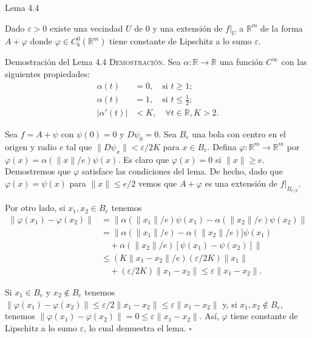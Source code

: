 \documentclass[10pt]{beamer}
\begin{document}
	\begin{frame}{Lema 4.4}
		\begin{lemma}[4.4]
			Dado $\varepsilon > 0$ existe una vecindad $U$ de $0$ y una extensión de $f|_U$ a $\mathbb{R}^m$ de la forma $A + \varphi$ donde $\varphi \in C^0_b(\mathbb{R}^m)$ tiene constante de Lipschitz a lo sumo $\varepsilon$.
		\end{lemma}
	\end{frame}
	
	\begin{frame}[allowframebreaks]{Demostración del Lema 4.4}
		\textsc{Demostración.} Sea $\alpha: \mathbb{R} \to \mathbb{R}$ una función $C^\infty$ con las siguientes propiedades:
		\begin{align*}
			\alpha(t) &= 0, \quad \text{si } t \ge 1; \\
			\alpha(t) &= 1, \quad \text{si } t \le \frac{1}{2}; \\
			|\alpha'(t)| &< K, \quad \forall t \in \mathbb{R}, K > 2.
		\end{align*}
		
		Sea $f = A + \psi$ con $\psi(0) = 0$ y $D\psi_0 = 0$. Sea $B_e$ una bola con centro en el origen y radio $e$ tal que $\|D\psi_x\| < \varepsilon/2K$ para $x \in B_e$. Defina $\varphi: \mathbb{R}^m \to \mathbb{R}^m$ por $\varphi(x) = \alpha(\|x\|/e)\psi(x)$. Es claro que $\varphi(x) = 0$ si $\|x\| \ge e$. Demostremos que $\varphi$ satisface las condiciones del lema. De hecho, dado que $\varphi(x) = \psi(x)$ para $\|x\| \le e/2$ vemos que $A + \varphi$ es una extensión de $f|_{B_{e/2}}$. 
		
		\framebreak
		
		Por otro lado, si $x_1, x_2 \in B_e$ tenemos
		\begin{align*}
			\|\varphi(x_1) - \varphi(x_2)\| &= \|\alpha(\|x_1\|/e)\psi(x_1) - \alpha(\|x_2\|/e)\psi(x_2)\| \\
			&= \|\alpha(\|x_1\|/e) - \alpha(\|x_2\|/e)]\psi(x_1) \\
			&\quad + \alpha(\|x_2\|/e)[\psi(x_1) - \psi(x_2)]\| \\
			&\le (K\|x_1 - x_2\|/e)(\varepsilon/2K)\|x_1\| \\
			&\quad + (\varepsilon/2K)\|x_1 - x_2\| \le \varepsilon\|x_1 - x_2\|.
		\end{align*}
		
		Si $x_1 \in B_e$ y $x_2 \notin B_e$ tenemos $\|\varphi(x_1) - \varphi(x_2)\| \le \varepsilon/2\|x_1 - x_2\| \le \varepsilon\|x_1 - x_2\|$ y, si $x_1, x_2 \notin B_e$, tenemos $\|\varphi(x_1) - \varphi(x_2)\| = 0 \le \varepsilon\|x_1 - x_2\|$. Así, $\varphi$ tiene constante de Lipschitz a lo sumo $\varepsilon$, lo cual demuestra el lema. \hfill $\square$
	\end{frame}
	
\end{document}
